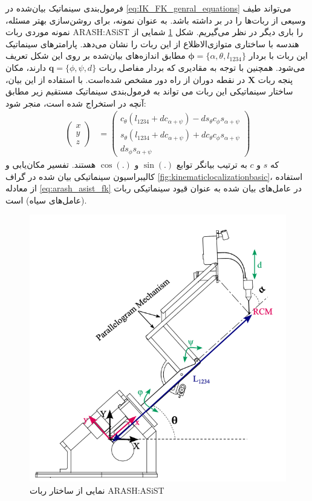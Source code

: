 فرمول‌بندی سینماتیک بیان‌شده در 
\ref{eq:IK_FK_genral_equations}
می‌تواند طیف وسیعی از ربات‌ها را در بر داشته باشد. به عنوان نمونه، برای روشن‌سازی بهتر مسئله، نمونه موردی ربات
ARASH:ASiST
را باری دیگر در نظر می‌گیریم. شکل
\ref{fig:arashasiststructure}
شمایی از هندسه با ساختاری متوازی‌الاظلاع از این ربات را نشان می‌دهد. پارامترهای سینماتیک این ربات با بردار
$\boldsymbol{\phi} = \{ \alpha, \theta , l_{1234} \} $
مطابق اندازه‌های بیان‌شده بر روی این شکل تعریف می‌شود. همچنین با توجه به مقادیری که بردار مفاصل ربات 
$ \boldsymbol{q}=\{ \phi, \psi, d \} $
دارند، مکان پنجه ربات
$\boldsymbol{X}$
در نقطه دوران از راه دور مشخص شده‌است. با استفاده از این بیان، ساختار سینماتیکی این ربات می تواند به فرمول‌بندی سینماتیک  مستقیم زیر مطابق آنچه در
\cite{hassani2021kinematic}
استخراج شده است، منجر شود:
\begin{equation} \label{eq:arash_asist_fk}
		\begin{aligned}
			\left( \begin{array}{c}
				x \\
				y \\
				z 
			\end{array} \right)
			&=
			\left( \begin{array}{c}
				c_{\theta}(l_{1234} + dc_{\alpha + \psi}) - ds_{\theta}c_{\phi}s_{\alpha + \psi} \\
				s_{\theta}(l_{1234} + dc_{\alpha + \psi}) + d c_{\theta}c_{\phi}s_{\alpha + \psi} \\
				ds_{\phi} s_{\alpha + \psi}
			\end{array} \right)
		\end{aligned}
\end{equation}
که $s$ و $c$ به ترتیب بیانگر توابع 
$\sin(.)$
و
$\cos(.)$
هستند. تفسیر مکان‌یابی و کالیبراسیون سینماتیکی بیان شده در گراف
\ref{fig:kinematiclocalizationbasic}،
استفاده از معادله
\ref{eq:arash_asist_fk}
در عامل‌های بیان شده به عنوان قیود سینماتیکی ربات (عامل‌های سیاه) است. 

\begin{figure}
	\centering
	\includegraphics[width=0.5\linewidth]{img/ARASH_ASIST_Structure}
	\caption{نمایی از ساختار ربات ARASH:ASiST}
	\label{fig:arashasiststructure}
\end{figure}

